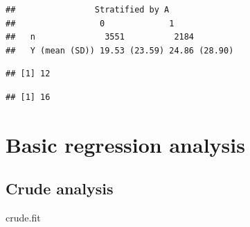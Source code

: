 \documentclass[
]{book}
\newenvironment{Shaded}{\begin{snugshade}}{\end{snugshade}}
\newcommand{\AttributeTok}[1]{\textcolor[rgb]{0.77,0.63,0.00}{#1}}
\newcommand{\CommentTok}[1]{\textcolor[rgb]{0.56,0.35,0.01}{\textit{#1}}}
\newcommand{\DecValTok}[1]{\textcolor[rgb]{0.00,0.00,0.81}{#1}}
\newcommand{\FunctionTok}[1]{\textcolor[rgb]{0.00,0.00,0.00}{#1}}
\newcommand{\NormalTok}[1]{#1}
\newcommand{\OtherTok}[1]{\textcolor[rgb]{0.56,0.35,0.01}{#1}}
\newcommand{\SpecialCharTok}[1]{\textcolor[rgb]{0.00,0.00,0.00}{#1}}
\begin{document}
\begin{verbatim}
##                Stratified by A
##                 0             1            
##   n              3551          2184        
##   Y (mean (SD)) 19.53 (23.59) 24.86 (28.90)
\end{verbatim}

\begin{Shaded}
\end{Shaded}

\begin{verbatim}
## [1] 12
\end{verbatim}

\begin{verbatim}
## [1] 16
\end{verbatim}

\hypertarget{basic-regression-analysis}{%
\section{Basic regression analysis}\label{basic-regression-analysis}}

\hypertarget{crude-analysis}{%
\subsection{Crude analysis}\label{crude-analysis}}

\begin{Shaded}
\end{Shaded}

\begin{Shaded}
\begin{Highlighting}[]
\NormalTok{crude.fit}
\end{Highlighting}
\end{Shaded}
\end{document}
